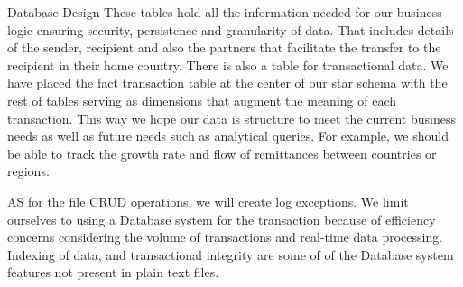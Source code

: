 \documentclass{beamer}
\begin{document}
\begin{frame}{Database Design}
These tables hold all the information needed for our business logic ensuring security, persistence and granularity of data. That includes details of the sender, recipient and also the partners that facilitate the transfer to the recipient in their home country. There is also a table for transactional data. We have placed the fact transaction table at the center of our star schema with the rest of tables serving as dimensions that augment the meaning of each transaction. This way we hope our data is structure to meet the current business needs as well as future needs such as analytical queries. For example, we should be able to track the growth rate and flow of remittances between countries or regions.

        AS for the file CRUD operations, we will create log exceptions. We limit ourselves to using a Database system for the transaction because of efficiency concerns considering the volume of transactions and real-time data processing. Indexing of data, and transactional integrity are some of of the Database system features not present in plain text files. 
    
\end{frame}
\end{document}
